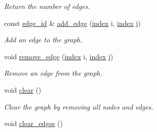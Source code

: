 \begin{DoxyCompactItemize}
\begin{DoxyCompactList}\small\item\em Return the number of edges. \end{DoxyCompactList}\item 
const \hyperlink{structmerlin_1_1edge__id}{edge\+\_\+id} \& \hyperlink{classmerlin_1_1graph_abb6ac50bdc67b24c70ac9cb896475350}{add\+\_\+edge} (\hyperlink{classmerlin_1_1graph_a5cade38832f47248573e921276f122d6}{index} i, \hyperlink{classmerlin_1_1graph_a5cade38832f47248573e921276f122d6}{index} j)
\begin{DoxyCompactList}\small\item\em Add an edge to the graph. \end{DoxyCompactList}\item 
void \hyperlink{classmerlin_1_1graph_a1d17b17fbf5b8378c1d65b885e688897}{remove\+\_\+edge} (\hyperlink{classmerlin_1_1graph_a5cade38832f47248573e921276f122d6}{index} i, \hyperlink{classmerlin_1_1graph_a5cade38832f47248573e921276f122d6}{index} j)
\begin{DoxyCompactList}\small\item\em Remove an edge from the graph. \end{DoxyCompactList}\item 
void \hyperlink{classmerlin_1_1graph_a1971a84f3b1b32af0a4eeff502c491e3}{clear} ()\hypertarget{classmerlin_1_1graph_a1971a84f3b1b32af0a4eeff502c491e3}{}\label{classmerlin_1_1graph_a1971a84f3b1b32af0a4eeff502c491e3}

\begin{DoxyCompactList}\small\item\em Clear the graph by removing all nodes and edges. \end{DoxyCompactList}\item 
void \hyperlink{classmerlin_1_1graph_a1c405b536daed8d6f4f4ca49b0e93834}{clear\+\_\+edges} ()\hypertarget{classmerlin_1_1graph_a1c405b536daed8d6f4f4ca49b0e93834}{}\label{classmerlin_1_1graph_a1c405b536daed8d6f4f4ca49b0e93834}


\end{DoxyCompactItemize}
